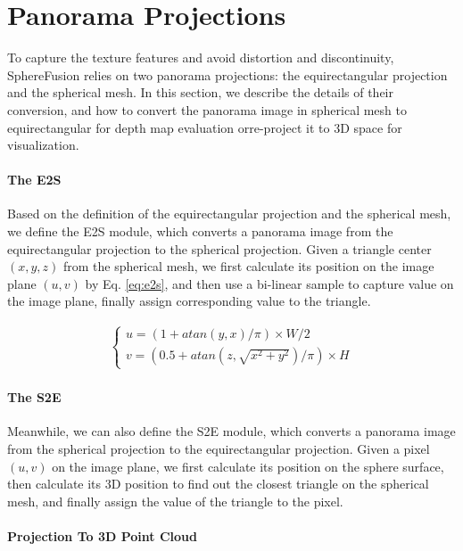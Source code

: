 \clearpage
\setcounter{page}{1}
\maketitlesupplementary

\section{Panorama Projections}

To capture the texture features and avoid distortion and discontinuity, SphereFusion relies on two panorama projections: the equirectangular projection and the spherical mesh. In this section, we describe the details of their conversion, and how to convert the panorama image in spherical mesh to equirectangular for depth map evaluation orre-project it to 3D space for visualization.


\paragraph{The E2S}

Based on the definition of the equirectangular projection and the spherical mesh, we define the E2S module, which converts a panorama image from the equirectangular projection to the spherical projection. Given a triangle center $(x, y, z)$ from the spherical mesh, we first calculate its position on the image plane $(u, v)$ by Eq. \ref{eq:e2s}, and then use a bi-linear sample to capture value on the image plane, finally assign corresponding value to the triangle.

\begin{align}
	\label{eq:e2s}
	\begin{cases}
        u = (1+atan(y,x)/\pi) \times W/2  \\
        v = (0.5+atan(z,\sqrt{x^2+y^2})/\pi ) \times H
	\end{cases}
\end{align}

\paragraph{The S2E}

Meanwhile, we can also define the S2E module, which converts a panorama image from the spherical projection to the equirectangular projection. Given a pixel $(u, v)$ on the image plane, we first calculate its position on the sphere surface, then calculate its 3D position to find out the closest triangle on the spherical mesh, and finally assign the value of the triangle to the pixel.

\paragraph{Projection To 3D Point Cloud}

